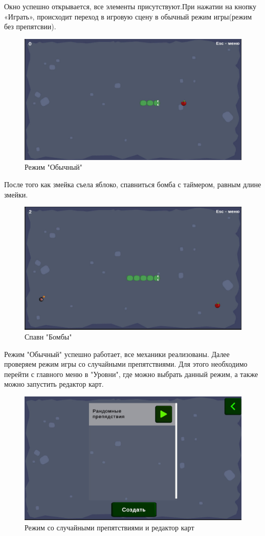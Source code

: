 Окно успешно открывается, все элементы присутствуют.При нажатии на кнопку «Играть», происходит переход в игровую сцену в обычный режим игры(режим без препятсвии).

\begin{figure}[h]
\centering
\includegraphics[width=0.8\linewidth]{images/basegame.jpg}
\caption{Режим "Обычный"}
\label{fig:mpr}
\end{figure}

После того как змейка съела яблоко, спавниться бомба с таймером, равным длине змейки.

\begin{figure}[h]
\centering
\includegraphics[width=0.8\linewidth]{images/bomb.jpg}
\caption{Спавн "Бомбы"}
\label{fig:mpr}
\end{figure}

Режим "Обычный" успешно работает, все механики реализованы. Далее проверяем режим игры со случайными препятствиями.  Для этого необходимо перейти с главного меню в "Уровни", где можно выбрать данный режим, а также можно запустить редактор карт.

\begin{figure}[h]
\centering
\includegraphics[width=0.8\linewidth]{images/urovni.jpg}
\caption{Режим со случайными препятствиями и редактор карт}
\label{fig:mpr}
\end{figure}

